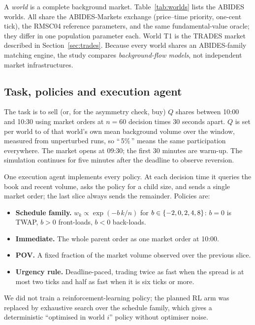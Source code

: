 A \emph{world} is a complete background market. Table~\ref{tab:worlds} lists the \nWorlds{} ABIDES worlds. All share the ABIDES-Markets exchange (price--time priority, one-cent tick), the RMSC04 reference parameters, and the same fundamental-value oracle; they differ in one population parameter each. World T1 is the TRADES market described in Section~\ref{sec:trades}. Because every world shares an ABIDES-family matching engine, the study compares \emph{background-flow models}, not independent market infrastructures.



\subsection{Task, policies and execution agent}

The task is to sell (or, for the asymmetry check, buy) $Q$ shares between 10:00 and 10:30 using market orders at $n=60$ decision times 30 seconds apart. $Q$ is set per world to \sizesText{} of that world's own mean background volume over the window, measured from unperturbed runs, so ``\,5\%\,'' means the same participation everywhere. The market opens at 09:30; the first 30 minutes are warm-up. The simulation continues for five minutes after the deadline to observe reversion.

One execution agent implements every policy. At each decision time it queries the book and recent volume, asks the policy for a child size, and sends a single market order; the last slice always sends the remainder. Policies are:
\begin{itemize}[leftmargin=*,itemsep=1pt]
\item \textbf{Schedule family.} $w_k \propto \exp(-b\,k/n)$ for $b\in\{-2, 0, 2, 4, 8\}$: $b=0$ is TWAP, $b>0$ front-loads, $b<0$ back-loads.
\item \textbf{Immediate.} The whole parent order as one market order at 10:00.
\item \textbf{POV.} A fixed fraction of the market volume observed over the previous slice.
\item \textbf{Urgency rule.} Deadline-paced, trading twice as fast when the spread is at most two ticks and half as fast when it is six ticks or more.
\end{itemize}
We did not train a reinforcement-learning policy; the planned RL arm was replaced by exhaustive search over the schedule family, which gives a deterministic ``optimised in world $i$'' policy without optimiser noise.


